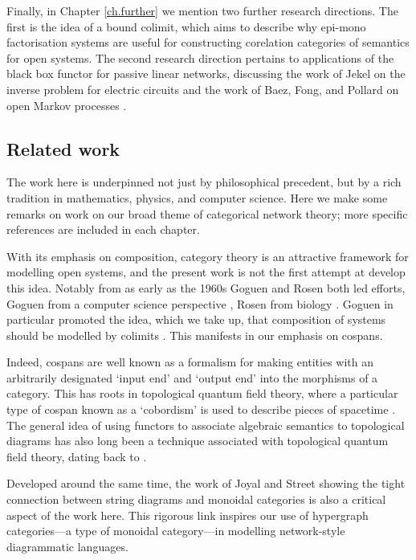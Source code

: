 Finally, in Chapter \ref{ch.further} we mention two further research directions.
The first is the idea of a bound colimit, which aims to describe why epi-mono
factorisation systems are useful for constructing corelation categories of
semantics for open systems. The second research direction pertains to
applications of the black box functor for passive linear networks, discussing
the work of Jekel on the inverse problem for electric circuits \cite{Jek} and
the work of Baez, Fong, and Pollard on open Markov processes \cite{BFP,
Pol16}.

\subsection*{Related work}

The work here is underpinned not just by philosophical precedent, but by a rich
tradition in mathematics, physics, and computer science. Here we make some
remarks on work on our broad theme of categorical network theory; more specific
references are included in each chapter. 

With its emphasis on composition, category theory is an attractive framework for
modelling open systems, and the present work is not the first attempt at develop
this idea. Notably from as early as the 1960s Goguen and Rosen both led efforts,
Goguen from a computer science perspective \cite{Go}, Rosen from
biology \cite{Ros12}. Goguen in particular promoted the idea, which we take up,
that composition of systems should be modelled by colimits \cite{Gog91}. This
manifests in our emphasis on cospans.

Indeed, cospans are well known as a formalism for making entities with an
arbitrarily designated `input end' and `output end' into the morphisms of a
category. This has roots in topological quantum field theory, where a particular
type of cospan known as a `cobordism' is used to describe pieces of spacetime
\cite{BL,BaezStay}. The general idea of using functors to associate algebraic
semantics to topological diagrams has also long been a technique associated with
topological quantum field theory, dating back to \cite{At}.  

Developed around the same time, the work of Joyal and Street showing the tight
connection between string diagrams and monoidal categories \cite{JS91,JS93} is
also a critical aspect of the work here. This rigorous link inspires our use of
hypergraph categories---a type of monoidal category---in modelling network-style
diagrammatic languages.

